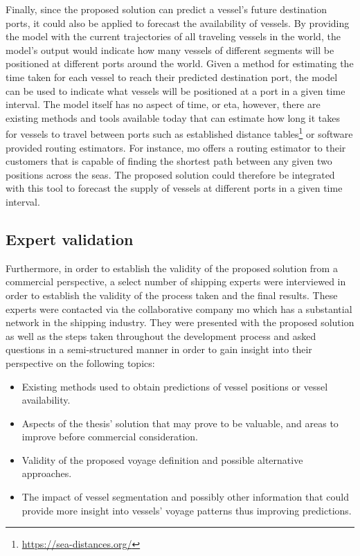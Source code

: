 Finally, since the proposed solution can predict a vessel's future destination ports, it could also be applied to forecast the availability of vessels. By providing the model with the current trajectories of all traveling vessels in the world, the model's output would indicate how many vessels of different segments will be positioned at different ports around the world. Given a method for estimating the time taken for each vessel to reach their predicted destination port, the model can be used to indicate what vessels will be positioned at a port in a given time interval. The model itself has no aspect of time, or \acrshort{eta}, however, there are existing methods and tools available today that can estimate how long it takes for vessels to travel between ports such as established distance tables\footnote{\url{https://sea-distances.org/}} or software provided routing estimators. For instance, \acrfull{mo} offers a routing estimator to their customers that is capable of finding the shortest path between any given two positions across the seas. The proposed solution could therefore be integrated with this tool to forecast the supply of vessels at different ports in a given time interval.

\subsection{Expert validation}

Furthermore, in order to establish the validity of the proposed solution from a commercial perspective, a select number of shipping experts were interviewed in order to establish the validity of the process taken and the final results. These experts were contacted via the collaborative company \acrfull{mo} which has a substantial network in the shipping industry. They were presented with the proposed solution as well as the steps taken throughout the development process and asked questions in a semi-structured manner in order to gain insight into their perspective on the following topics:

\begin{itemize}
    \item Existing methods used to obtain predictions of vessel positions or vessel availability.
    \item Aspects of the thesis' solution that may prove to be valuable, and areas to improve before commercial consideration.
    \item Validity of the proposed voyage definition and possible alternative approaches.
    \item The impact of vessel segmentation and possibly other information that could provide more insight into vessels' voyage patterns thus improving predictions.
\end{itemize}

